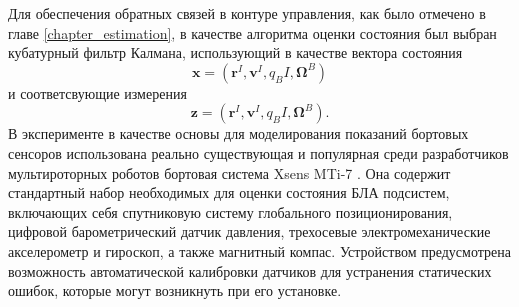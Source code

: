 Для обеспечения обратных связей в контуре управления, как было отмечено в главе \ref{chapter_estimation}, в качестве алгоритма оценки состояния был выбран кубатурный фильтр Калмана, использующий в качестве вектора состояния
\begin{equation}
\bm x = (\bm r^I, \bm v^I, q_BI, \bm \Omega^B)
\end{equation}
и соответсвующие измерения
\begin{equation}
\bm z = (\bm r^I, \bm v^I, q_BI, \bm \Omega^B).
\end{equation}
В эксперименте в качестве основы для моделирования показаний бортовых сенсоров использована реально существующая и популярная среди разработчиков мультироторных роботов бортовая система Xsens MTi-7 \cite{xsens01}.
Она содержит стандартный набор необходимых для оценки состояния БЛА подсистем, включающих себя спутниковую систему глобального позиционирования, цифровой барометрический датчик давления, трехосевые электромеханические акселерометр и гироскоп, а также магнитный компас.
Устройством предусмотрена возможность автоматической калибровки датчиков для устранения статических ошибок, которые могут возникнуть при его установке.


